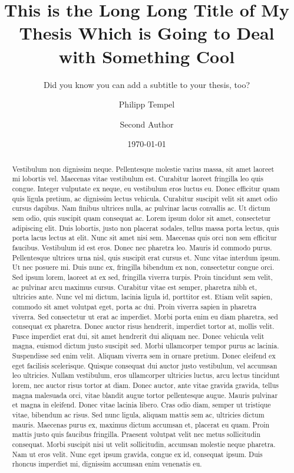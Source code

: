 \documentclass[%
  english,%
]{doctorate}
\title{This is the Long Long Title of My Thesis Which is Going to Deal with Something Cool}
\subtitle{Did you know you can add a subtitle to your thesis, too?}
\author{Philipp Tempel \and Second Author}
\date{\today}
\begin{document}
\frontmatter

\maketitle

\begin{otherlanguage}{german}
  \maketitle
\end{otherlanguage}

\begin{abstract}
  Vestibulum non dignissim neque. Pellentesque molestie varius massa, sit amet laoreet mi lobortis vel. Maecenas vitae vestibulum est. Curabitur laoreet fringilla leo quis congue. Integer vulputate ex neque, eu vestibulum eros luctus eu. Donec efficitur quam quis ligula pretium, ac dignissim lectus vehicula. Curabitur suscipit velit sit amet odio cursus dapibus. Nam finibus ultrices nulla, ac pulvinar lacus convallis ac. Ut dictum sem odio, quis suscipit quam consequat ac. Lorem ipsum dolor sit amet, consectetur adipiscing elit.
  Duis lobortis, justo non placerat sodales, tellus massa porta lectus, quis porta lacus lectus at elit. Nunc sit amet nisi sem. Maecenas quis orci non sem efficitur faucibus. Vestibulum id est eros. Donec nec pharetra leo. Mauris id commodo purus. Pellentesque ultrices urna nisl, quis suscipit erat cursus et. Nunc vitae interdum ipsum. Ut nec posuere mi. Duis nunc ex, fringilla bibendum ex non, consectetur congue orci. Sed ipsum lorem, laoreet at ex sed, fringilla viverra turpis. Proin tincidunt sem velit, ac pulvinar arcu maximus cursus. Curabitur vitae est semper, pharetra nibh et, ultricies ante.
  Nunc vel mi dictum, lacinia ligula id, porttitor est. Etiam velit sapien, commodo sit amet volutpat eget, porta ac dui. Proin viverra sapien in pharetra viverra. Sed consectetur ut erat ac imperdiet. Morbi porta enim eu diam pharetra, sed consequat ex pharetra. Donec auctor risus hendrerit, imperdiet tortor at, mollis velit. Fusce imperdiet erat dui, sit amet hendrerit dui aliquam nec. Donec vehicula velit magna, euismod dictum justo suscipit sed. Morbi ullamcorper tempor purus ac lacinia. Suspendisse sed enim velit. Aliquam viverra sem in ornare pretium.
  Donec eleifend ex eget facilisis scelerisque. Quisque consequat dui auctor justo vestibulum, vel accumsan leo ultricies. Nullam vestibulum, eros ullamcorper ultricies luctus, arcu lectus tincidunt lorem, nec auctor risus tortor at diam. Donec auctor, ante vitae gravida gravida, tellus magna malesuada orci, vitae blandit augue tortor pellentesque augue. Mauris pulvinar et magna in eleifend. Donec vitae lacinia libero. Cras odio diam, semper ut tristique vitae, bibendum ac risus. Sed nunc ligula, aliquam mattis sem ac, ultricies dictum mauris. Maecenas purus ex, maximus dictum accumsan et, placerat eu quam. Proin mattis justo quis faucibus fringilla. Praesent volutpat velit nec metus sollicitudin consequat. Morbi suscipit nisi ut velit sollicitudin, accumsan molestie neque pharetra. Nam ut eros velit. Nunc eget ipsum gravida, congue ex id, consequat ipsum. Duis rhoncus imperdiet mi, dignissim accumsan enim venenatis eu.
  

\end{abstract}
\end{document}
